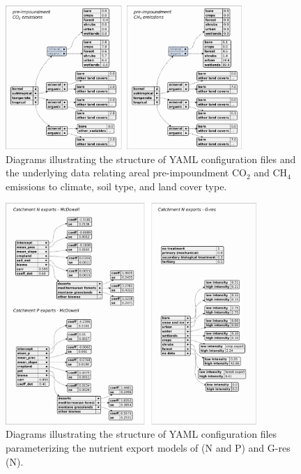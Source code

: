 \documentclass[final,1p,times]{elsarticle}
\begin{document}
\begin{figure}[ht]
    \centering
    \includegraphics[width=0.80\textwidth]{figures/preimpoundment.pdf}
    \caption{Diagrams illustrating the structure of YAML configuration files and the underlying data relating areal pre-impoundment CO$_2$ and CH$_4$ emissions to climate, soil type, and land cover type.}
    \label{fig:preimpoundment}
\end{figure}

\begin{figure}[ht]
    \centering
    \includegraphics[width=0.85\textwidth]{figures/tp_tn_exports.pdf}
    \caption{Diagrams illustrating the structure of YAML configuration files parameterizing the nutrient export models of \citet{McDowell2020} (\ac{N} and \ac{P}) and G-res (\ac{N}).}
    \label{fig:tp_tn_exports}
\end{figure}
\end{document}
